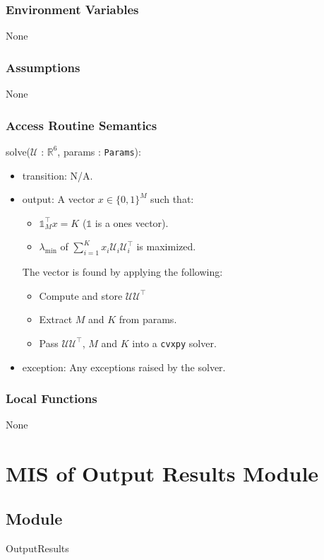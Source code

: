 \documentclass[12pt, titlepage]{article}
\begin{document}
\subsubsection{Environment Variables}
None 

\subsubsection{Assumptions}
None

\subsubsection{Access Routine Semantics}

\noindent solve($\mathcal{U}$ : $\mathbb{R}^6$, params : \texttt{Params}):
\begin{itemize}
\item transition: N/A.
\item output: A vector $x \in \{ 0, 1 \}^M$ such that:
\begin{itemize}
  \item $\mathds{1}_M^\top x = K$ ($\mathds{1}$ is a ones vector).
  \item $\lambda_{\text{min}}$ of $\sum^K_{i=1} x_i \mathcal{U}_i \mathcal{U}_i^\top$ is maximized. 
\end{itemize}
The vector is found by applying the following:
\begin{itemize}
  \item Compute and store $\mathcal{U} \mathcal{U}^\top$ 
  \item Extract $M$ and $K$ from params.
  \item Pass $\mathcal{U} \mathcal{U}^\top$, $M$ and $K$ into a \texttt{cvxpy} solver.
\end{itemize}
\item exception: Any exceptions raised by the solver.  
\end{itemize}

\subsubsection{Local Functions}
None

\newpage

\section{MIS of Output Results Module} \label{MISResults}

\subsection{Module}
OutputResults 
\end{document}
